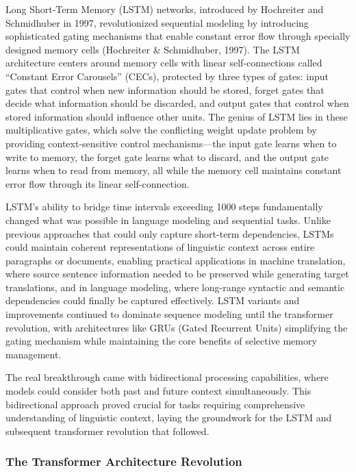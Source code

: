 \documentclass[
  titlepage]{article}
\begin{document}
Long Short-Term Memory (LSTM) networks, introduced by Hochreiter and
Schmidhuber in 1997, revolutionized sequential modeling by introducing
sophisticated gating mechanisms that enable constant error flow through
specially designed memory cells (Hochreiter \& Schmidhuber, 1997). The
LSTM architecture centers around memory cells with linear
self-connections called ``Constant Error Carousels'' (CECs), protected
by three types of gates: input gates that control when new information
should be stored, forget gates that decide what information should be
discarded, and output gates that control when stored information should
influence other units. The genius of LSTM lies in these multiplicative
gates, which solve the conflicting weight update problem by providing
context-sensitive control mechanisms---the input gate learns when to
write to memory, the forget gate learns what to discard, and the output
gate learns when to read from memory, all while the memory cell
maintains constant error flow through its linear self-connection.

LSTM's ability to bridge time intervals exceeding 1000 steps
fundamentally changed what was possible in language modeling and
sequential tasks. Unlike previous approaches that could only capture
short-term dependencies, LSTMs could maintain coherent representations
of linguistic context across entire paragraphs or documents, enabling
practical applications in machine translation, where source sentence
information needed to be preserved while generating target translations,
and in language modeling, where long-range syntactic and semantic
dependencies could finally be captured effectively. LSTM variants and
improvements continued to dominate sequence modeling until the
transformer revolution, with architectures like GRUs (Gated Recurrent
Units) simplifying the gating mechanism while maintaining the core
benefits of selective memory management.

The real breakthrough came with bidirectional processing capabilities,
where models could consider both past and future context simultaneously.
This bidirectional approach proved crucial for tasks requiring
comprehensive understanding of linguistic context, laying the groundwork
for the LSTM and subsequent transformer revolution that followed.

\subsubsection{The Transformer Architecture
Revolution}\label{the-transformer-architecture-revolution}
\end{document}
